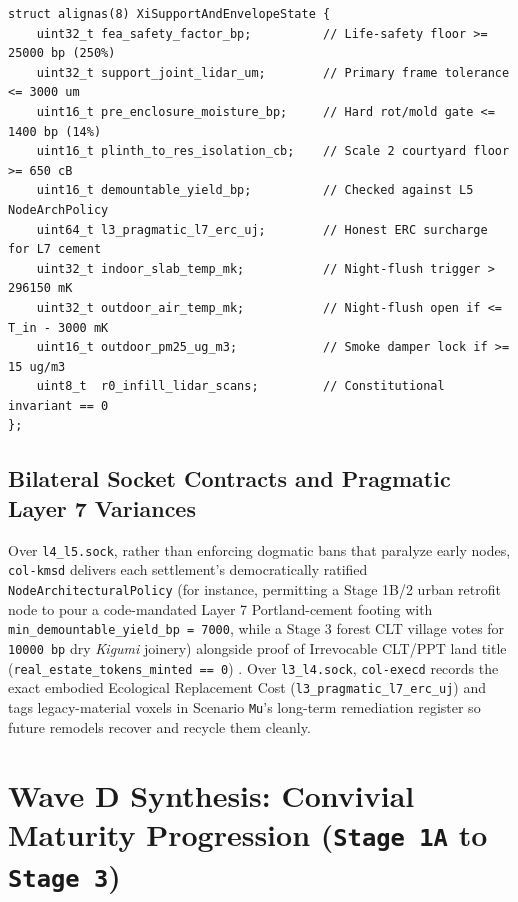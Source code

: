 \begin{lstlisting}[caption={Scenario \texttt{Xi} Support Moisture Gate, Pragmatic L7 Variance, and Night-Flush Damper Structs},label={lst:xi-structs}]
struct alignas(8) XiSupportAndEnvelopeState {
    uint32_t fea_safety_factor_bp;          // Life-safety floor >= 25000 bp (250%)
    uint32_t support_joint_lidar_um;        // Primary frame tolerance <= 3000 um
    uint16_t pre_enclosure_moisture_bp;     // Hard rot/mold gate <= 1400 bp (14%)
    uint16_t plinth_to_res_isolation_cb;    // Scale 2 courtyard floor >= 650 cB
    uint16_t demountable_yield_bp;          // Checked against L5 NodeArchPolicy
    uint64_t l3_pragmatic_l7_erc_uj;        // Honest ERC surcharge for L7 cement
    uint32_t indoor_slab_temp_mk;           // Night-flush trigger > 296150 mK
    uint32_t outdoor_air_temp_mk;           // Night-flush open if <= T_in - 3000 mK
    uint16_t outdoor_pm25_ug_m3;            // Smoke damper lock if >= 15 ug/m3
    uint8_t  r0_infill_lidar_scans;         // Constitutional invariant == 0
};
\end{lstlisting}

\subsection{Bilateral Socket Contracts and Pragmatic Layer 7 Variances}

Over \texttt{l4\_l5.sock}, rather than enforcing dogmatic bans that paralyze early nodes, \texttt{col-kmsd} delivers each settlement's
democratically ratified \texttt{NodeArchitecturalPolicy} (for instance, permitting a Stage 1B/2 urban retrofit node to pour a code-mandated Layer
7 Portland-cement footing with \texttt{min\_demountable\_yield\_bp = 7000}, while a Stage 3 forest CLT village votes for \texttt{10000 bp} dry
\emph{Kigumi} joinery) alongside proof of Irrevocable CLT/PPT land title (\texttt{real\_estate\_tokens\_minted == 0}) \parencite{ostrom1990}.
Over \texttt{l3\_l4.sock}, \texttt{col-execd} records the exact embodied Ecological Replacement Cost (\texttt{l3\_pragmatic\_l7\_erc\_uj}) and
tags legacy-material voxels in Scenario \texttt{Mu}'s long-term remediation register so future remodels recover and recycle them cleanly.

\section{Wave D Synthesis: Convivial Maturity Progression (\texttt{Stage 1A} to \texttt{Stage 3})}
\label{sec:wave-d-maturity}

